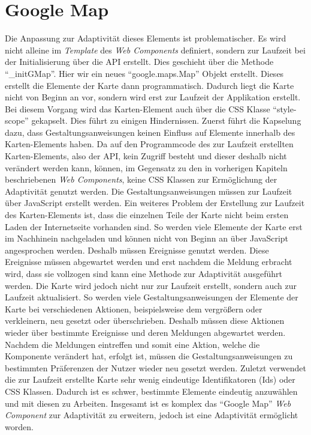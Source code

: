 \documentclass[12pt, paper=a4, bibtotoc, toc=listof, headsepline=true, numbers=endperiod]{scrreprt}
\begin{document}
	\section{Google Map}
	\label{sec:fazGogMap}
	Die Anpassung zur Adaptivität dieses Elements ist problematischer.
	Es wird nicht alleine im \emph{Template} des \emph{Web Components} definiert, sondern zur Laufzeit bei der Initialisierung über die \ac{API} erstellt. Dies geschieht über die Methode \enquote{\_initGMap}. Hier wir ein neues \enquote{google.maps.Map} Objekt erstellt. Dieses erstellt die Elemente der Karte dann programmatisch. Dadurch liegt die Karte nicht von Beginn an vor, sondern wird erst zur Laufzeit der Applikation erstellt. Bei diesem Vorgang wird das Karten-Element auch über die \ac{CSS} Klasse \enquote{style-scope} gekapselt. Dies führt zu einigen Hindernissen. Zuerst führt die Kapselung dazu, dass Gestaltungsanweisungen keinen Einfluss auf Elemente innerhalb des Karten-Elements haben. Da auf den Programmcode des zur Laufzeit erstellten Karten-Elements, also der \ac{API}, kein Zugriff besteht und dieser deshalb  nicht verändert werden kann, können, im Gegensatz zu den in vorherigen Kapiteln beschriebenen \emph{Web Components}, keine \ac{CSS} Klassen zur Ermöglichung der Adaptivität genutzt werden. Die Gestaltungsanweisungen müssen zur Laufzeit über JavaScript erstellt werden. Ein weiteres Problem der Erstellung zur Laufzeit des Karten-Elements ist, dass die einzelnen Teile der Karte nicht beim ersten Laden der Internetseite vorhanden sind. So werden viele Elemente der Karte erst im Nachhinein nachgeladen und können nicht von Beginn an über JavaScript angesprochen werden. Deshalb müssen Ereignisse genutzt werden. Diese Ereignisse müssen abgewartet werden und erst nachdem die Meldung erbracht wird, dass sie vollzogen sind kann eine Methode zur Adaptivität ausgeführt werden. Die Karte wird jedoch nicht nur zur Laufzeit erstellt, sondern auch zur Laufzeit aktualisiert. So werden viele Gestaltungsanweisungen der Elemente der Karte bei verschiedenen Aktionen, beispielsweise dem vergrößern oder verkleinern, neu gesetzt oder überschrieben. Deshalb müssen diese Aktionen wieder über bestimmte Ereignisse und deren Meldungen abgewartet werden. Nachdem die Meldungen eintreffen und somit eine Aktion, welche die Komponente verändert hat, erfolgt ist, müssen die Gestaltungsanweisungen zu bestimmten Präferenzen der Nutzer wieder neu gesetzt werden. Zuletzt verwendet die zur Laufzeit erstellte Karte sehr wenig eindeutige Identifikatoren (Ids) oder \ac{CSS} Klassen. Dadurch ist es schwer, bestimmte Elemente eindeutig anzuwählen und mit diesen zu Arbeiten. Insgesamt ist es komplex das \enquote{Google Map} \emph{Web Component} zur Adaptivität zu erweitern, jedoch ist eine Adaptivität ermöglicht worden.
	
\end{document}
